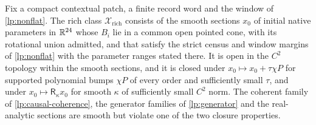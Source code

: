 Fix a compact contextual patch, a finite record word and the window of \cref{lp:nonflat}. The rich class $\mathcal X_{\mathrm{rich}}$ consists of the smooth sections $x_0$ of initial native parameters in $\mathbb R^{24}$ whose $B_i$ lie in a common open pointed cone, with its rotational union admitted, and that satisfy the strict census and window margins of \cref{lp:nonflat} with the parameter ranges stated there. It is open in the $C^2$ topology within the smooth sections, and it is closed under $x_0\mapsto x_0+\tau\chi P$ for supported polynomial bumps $\chi P$ of every order and sufficiently small $\tau$, and under $x_0\mapsto\mathsf R_{\kappa}x_0$ for smooth $\kappa$ of sufficiently small $C^2$ norm. The coherent family of \cref{lp:causal-coherence}, the generator families of \cref{lp:generator} and the real-analytic sections are smooth but violate one of the two closure properties.

